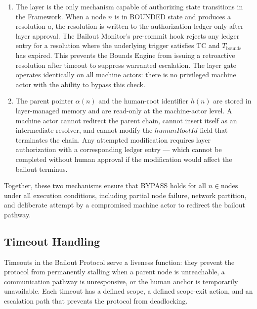 \begin{enumerate}
\item[\textbf{\fact{} Layer gate (enforcement at the authorization layer).}] The \fact{} layer is the only mechanism capable of authorizing state transitions in the \bxthree{} Framework. When a node $n$ is in BOUNDED state and produces a resolution $a$, the resolution is written to the authorization ledger only after \fact{} layer approval. The Bailout Monitor's pre-commit hook rejects any ledger entry for a resolution where the underlying trigger satisfies TC and $T_{\text{bounds}}$ has expired. This prevents the Bounds Engine from issuing a retroactive resolution after timeout to suppress warranted escalation. The \fact{} layer gate operates identically on all machine actors: there is no privileged machine actor with the ability to bypass this check.

\item[\textbf{Immutable parent-pointer and human-root architecture (enforcement at the data model layer).}] The parent pointer $\alpha(n)$ and the human-root identifier $h(n)$ are stored in \fact{} layer-managed memory and are read-only at the machine-actor level. A machine actor cannot redirect the parent chain, cannot insert itself as an intermediate resolver, and cannot modify the $humanRootId$ field that terminates the chain. Any attempted modification requires \purpose{} layer authorization with a corresponding ledger entry — which cannot be completed without human approval if the modification would affect the bailout terminus.
\end{enumerate}

Together, these two mechanisms ensure that BYPASS holds for all $n \in \text{nodes}$ under all execution conditions, including partial node failure, network partition, and deliberate attempt by a compromised machine actor to redirect the bailout pathway.

\subsection{Timeout Handling}\label{sec:timeout-handling}

Timeouts in the Bailout Protocol serve a liveness function: they prevent the protocol from permanently stalling when a parent node is unreachable, a communication pathway is unresponsive, or the human anchor is temporarily unavailable. Each timeout has a defined scope, a defined scope-exit action, and an escalation path that prevents the protocol from deadlocking.

